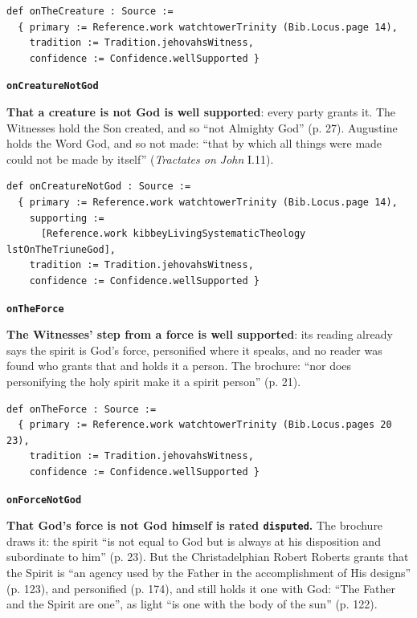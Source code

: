 \documentclass[11pt,paper=\testimonypaper,DIV=13,parskip=false]{scrartcl}
\begin{document}
{\small\begin{verbatim}
def onTheCreature : Source :=
  { primary := Reference.work watchtowerTrinity (Bib.Locus.page 14),
    tradition := Tradition.jehovahsWitness,
    confidence := Confidence.wellSupported }
\end{verbatim}}
\par\medskip\noindent\textbf{\texttt{on\allowbreak{}Creature\allowbreak{}Not\allowbreak{}God}}\par\nobreak\noindent
\textbf{That a creature is not God is well supported}: every party grants it. The Witnesses hold the Son created, and so “not Almighty God” (p. 27). Augustine holds the Word God, and so not made: “that by which all things were made could not be made by itself” (\emph{Tractates on John} I.11).

{\small\begin{verbatim}
def onCreatureNotGod : Source :=
  { primary := Reference.work watchtowerTrinity (Bib.Locus.page 14),
    supporting :=
      [Reference.work kibbeyLivingSystematicTheology lstOnTheTriuneGod],
    tradition := Tradition.jehovahsWitness,
    confidence := Confidence.wellSupported }
\end{verbatim}}
\par\medskip\noindent\textbf{\texttt{on\allowbreak{}The\allowbreak{}Force}}\par\nobreak\noindent
\textbf{The Witnesses’ step from a force is well supported}: its reading already says the spirit is God’s force, personified where it speaks, and no reader was found who grants that and holds it a person. The brochure: “nor does personifying the holy spirit make it a spirit person” (p. 21).

{\small\begin{verbatim}
def onTheForce : Source :=
  { primary := Reference.work watchtowerTrinity (Bib.Locus.pages 20 23),
    tradition := Tradition.jehovahsWitness,
    confidence := Confidence.wellSupported }
\end{verbatim}}
\par\medskip\noindent\textbf{\texttt{on\allowbreak{}Force\allowbreak{}Not\allowbreak{}God}}\par\nobreak\noindent
\textbf{That God’s force is not God himself is rated \texttt{disputed}.} The brochure draws it: the spirit “is not equal to God but is always at his disposition and subordinate to him” (p. 23). But the Christadelphian Robert Roberts grants that the Spirit is “an agency used by the Father in the accomplishment of His designs” (p. 123), and personified (p. 174), and still holds it one with God: “The Father and the Spirit are one”, as light “is one with the body of the sun” (p. 122).
\end{document}
